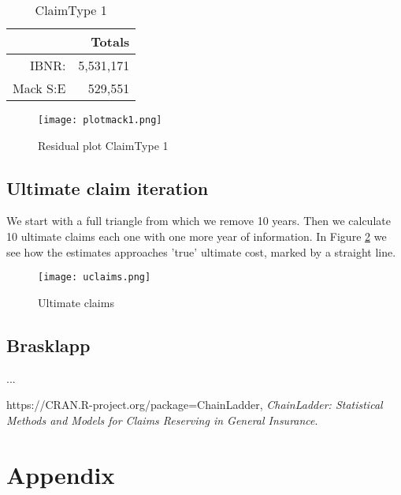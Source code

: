 \documentclass[a4paper]{article}
\begin{document}
\begin{table}[!ht]
\center
\begin{tabular}{rr}
	& Totals \\ 
\hline
IBNR: & 5,531,171 \\
Mack S:E & 529,551\\
\hline
\end{tabular}
\caption{ClaimType 1} \label{tab:mack1}
\end{table}


 \begin{figure}[H]
 \center
  \texttt{[image: plotmack1.png]}
  \caption{Residual plot ClaimType 1}
  \label{fig:mack1}
\end{figure}


\subsection*{Ultimate claim iteration}

We start with a full triangle from which we remove 10 years. Then we calculate 10 ultimate claims each one with one more year of information.
In Figure \ref{fig:ultimate} we see how the estimates approaches 'true' ultimate cost, marked by a straight line.
 \begin{figure}[H]
 \center
  \texttt{[image: uclaims.png]}
  \caption{Ultimate claims}
  \label{fig:ultimate}
\end{figure}


\subsection*{Brasklapp}
...

\begin{thebibliography}{99}
   https://CRAN.R-project.org/package=ChainLadder,
  \emph{ChainLadder: Statistical Methods and Models for Claims Reserving in General Insurance}.
\end{thebibliography}

\section*{Appendix}
\end{document}
